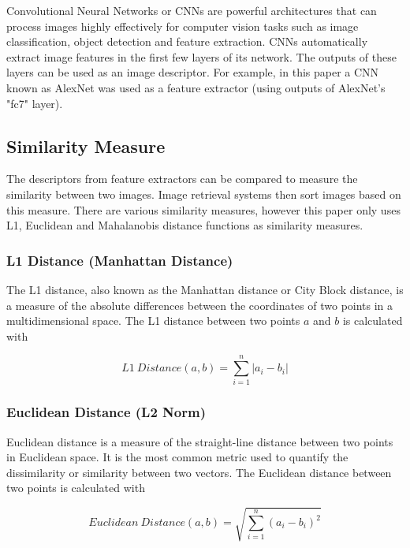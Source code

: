 Convolutional Neural Networks or CNNs are powerful architectures that can process images highly effectively for
computer vision tasks such as image classification, object detection and feature extraction. CNNs automatically extract
image features in the first few layers of its network. The outputs of these layers can be used as an image descriptor.
For example, in this paper a CNN known as AlexNet \cite{krizhevsky2012imagenet} was used as a feature extractor (using
outputs of AlexNet's "fc7" layer).

\subsection{Similarity Measure}
\label{sec:similarity_measure_details}

The descriptors from feature extractors can be compared to measure the similarity between two images. Image retrieval
systems then sort images based on this measure. There are various similarity measures, however this paper only uses
L1, Euclidean and Mahalanobis distance functions as similarity measures.

\subsubsection{L1 Distance (Manhattan Distance)}
\label{sec:l1_dist}

The L1 distance, also known as the Manhattan distance or City Block distance, is a measure of the absolute differences
between the coordinates of two points in a multidimensional space. The L1 distance between two points $a$ and $b$
is calculated with

\begin{equation}
  L1~Distance(a,b) = \sum_{i=1}^{n} | a_i - b_i |
  \label{eq:l1_distance}
\end{equation}

\subsubsection{Euclidean Distance (L2 Norm)}
\label{sec:euclidean_dist}

Euclidean distance is a measure of the straight-line distance between two points in Euclidean space. It is the most
common metric used to quantify the dissimilarity or similarity between two vectors. The Euclidean distance between
two points is calculated with

\begin{equation}
  Euclidean~Distance(a,b) = \sqrt{\sum_{i=1}^{n}  (a_i - b_i)^2}
  \label{eq:euclidean_distance}
\end{equation}

